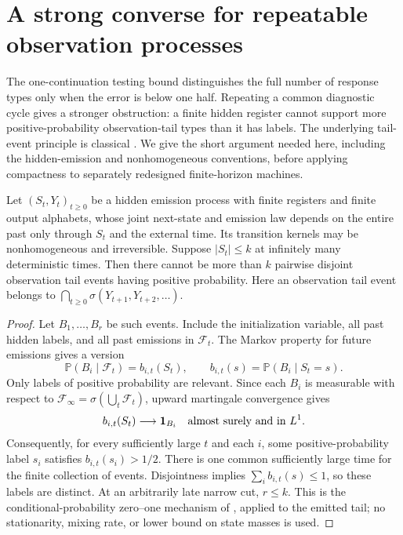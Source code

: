 \section{A strong converse for repeatable observation processes}
\label{sec:tail62}
The one-continuation testing bound distinguishes the full number of
response types only when the error is below one half. Repeating a
common diagnostic cycle gives a stronger obstruction: a finite hidden
register cannot support more positive-probability observation-tail types
than it has labels. The underlying tail-event principle is classical
\cite{Blackwell62,Cohn62,GS62}. We give the short argument needed here,
including the hidden-emission and nonhomogeneous conventions, before
applying compactness to separately redesigned finite-horizon machines.

\begin{lemma}\label{lem:tailcapacity62}
Let $(S_t,Y_t)_{t\ge0}$ be a hidden emission process with finite
registers and finite output alphabets, whose joint next-state and
emission law depends on the entire past only through $S_t$ and the
external time. Its transition kernels may be nonhomogeneous and
irreversible. Suppose $|S_t|\le k$ at infinitely many deterministic
times. Then there cannot be more than $k$ pairwise disjoint observation
tail events having positive probability. Here an observation tail event
belongs to $\bigcap_{t\ge0}\sigma(Y_{t+1},Y_{t+2},\ldots)$.
\end{lemma}
\begin{proof}
Let $B_1,\ldots,B_r$ be such events. Include the initialization variable,
all past hidden labels, and all past emissions in $\mathcal F_t$.
The Markov property for future emissions gives a version
\[
 \mathbb P(B_i\mid\mathcal F_t)=b_{i,t}(S_t),\qquad
 b_{i,t}(s)=\mathbb P(B_i\mid S_t=s).
\]
Only labels of positive probability are relevant. Since each $B_i$ is
measurable with respect to $\mathcal F_\infty=\sigma(\bigcup_t\mathcal F_t)$,
upward martingale convergence gives
\[
 b_{i,t}(S_t)\longrightarrow\boldsymbol1_{B_i}
                                  \quad\hbox{almost surely and in }L^1.
\]
Consequently, for every sufficiently large $t$ and each $i$, some
positive-probability label $s_i$ satisfies $b_{i,t}(s_i)>1/2$.
There is one common sufficiently large time for the finite collection
of events. Disjointness implies $\sum_i b_{i,t}(s)\le1$, so these
labels are distinct. At an arbitrarily late narrow cut, $r\le k$.
This is the conditional-probability zero--one mechanism of
\cite[Theorem~1 and Section~5.1]{GS62}, applied to the emitted tail;
no stationarity, mixing rate, or lower bound on state masses is used.
\end{proof}

